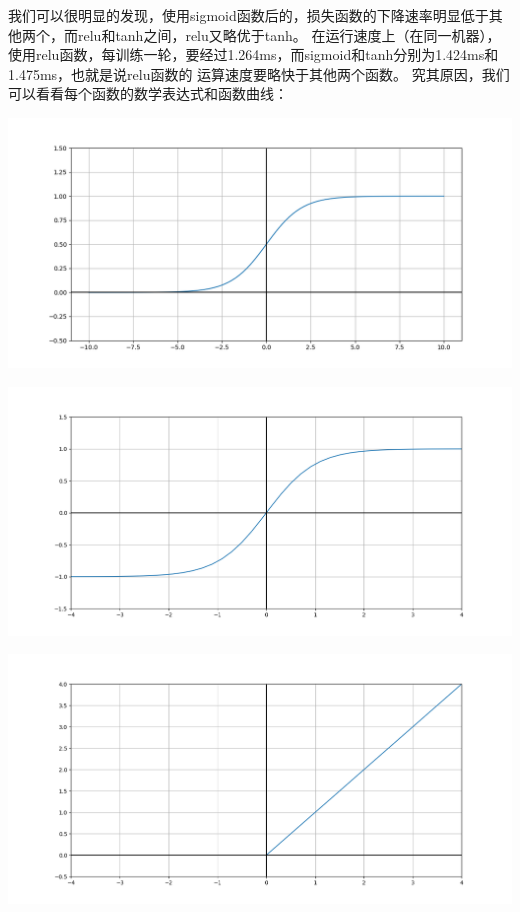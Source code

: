 \documentclass{article}
\begin{document}
我们可以很明显的发现，使用sigmoid函数后的，损失函数的下降速率明显低于其他两个，而relu和tanh之间，relu又略优于tanh。
在运行速度上（在同一机器），使用relu函数，每训练一轮，要经过1.264ms，而sigmoid和tanh分别为1.424ms和1.475ms，也就是说relu函数的
运算速度要略快于其他两个函数。
\newpage 究其原因，我们可以看看每个函数的数学表达式和函数曲线：\\
\vspace{10pt}
\begin{minipage}[t]{0.3\linewidth}
\centering 
\includegraphics[scale=0.1]{sigmoid.png}     
\end{minipage}%
\begin{minipage}[t]{0.3\linewidth} 
\centering 
\includegraphics[scale=0.1]{tanh.png} 
\end{minipage}%
\begin{minipage}[t]{0.3\linewidth} 
\centering 
\includegraphics[scale=0.1]{relu.png} 
\end{minipage}\\
\end{document}
